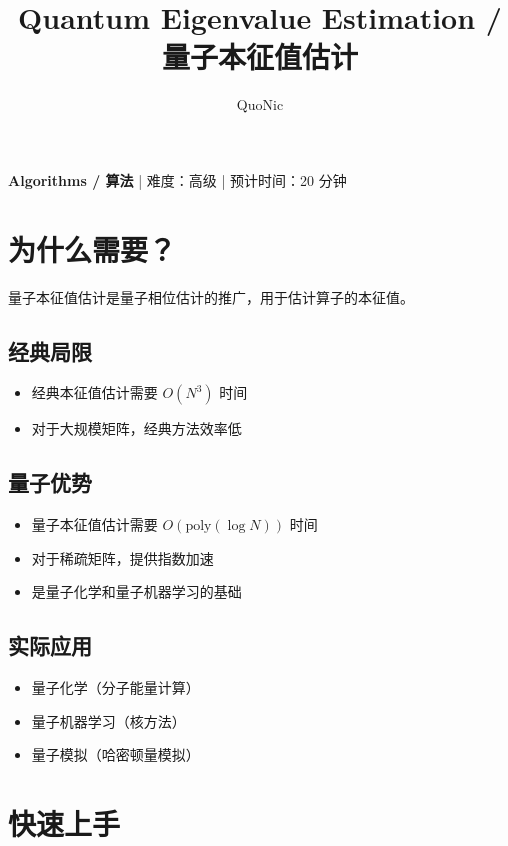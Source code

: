 \documentclass[12pt,a4paper]{article}
\title{Quantum Eigenvalue Estimation / 量子本征值估计}
\author{QuoNic}
\date{}
\begin{document}
\maketitle

\begin{center}
\textbf{Algorithms / 算法} | 难度：高级 | 预计时间：20 分钟
\end{center}

\tableofcontents
\newpage

\section{为什么需要？}

量子本征值估计是量子相位估计的推广，用于估计算子的本征值。

\subsection{经典局限}
\begin{itemize}
  \item 经典本征值估计需要 $O(N^3)$ 时间
  \item 对于大规模矩阵，经典方法效率低
\end{itemize}

\subsection{量子优势}
\begin{itemize}
  \item 量子本征值估计需要 $O(\text{poly}(\log N))$ 时间
  \item 对于稀疏矩阵，提供指数加速
  \item 是量子化学和量子机器学习的基础
\end{itemize}

\subsection{实际应用}
\begin{itemize}
  \item 量子化学（分子能量计算）
  \item 量子机器学习（核方法）
  \item 量子模拟（哈密顿量模拟）
\end{itemize}

\section{快速上手}
\end{document}
